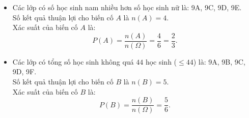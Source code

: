 \begin{bt}
{\begin{enumerate}[a)]
\begin{itemize}
        \item Các lớp có số học sinh nam nhiều hơn số học sinh nữ là: 9A, 9C, 9D, 9E.\\
        Số kết quả thuận lợi cho biến cố $A$ là $n(A) = 4$.\\
        Xác suất của biến cố $A$ là:
        $$P(A) = \dfrac{n(A)}{n(\Omega)} = \dfrac{4}{6} = \dfrac{2}{3}.$$
        \item Các lớp có tổng số học sinh không quá $44$ học sinh ($\le 44$) là: 9A, 9B, 9C, 9D, 9F.\\
        Số kết quả thuận lợi cho biến cố $B$ là $n(B) = 5$.\\
        Xác suất của biến cố $B$ là:
        $$P(B) = \dfrac{n(B)}{n(\Omega)} = \dfrac{5}{6}.$$
    \end{itemize}
\end{enumerate}
}
\end{bt}

